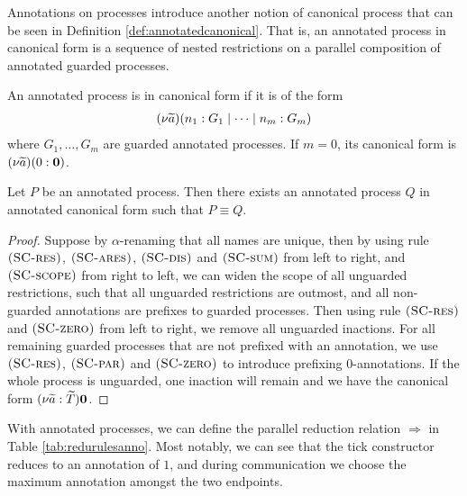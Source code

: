 Annotations on processes introduce another notion of canonical process that can be seen in Definition \ref{def:annotatedcanonical}. That is, an annotated process in canonical form is a sequence of nested restrictions on a parallel composition of annotated guarded processes.

\begin{defi}\label{def:annotatedcanonical}
An annotated process is in canonical form if it is of the form
\begin{align*}
    (\nu \widetilde{a}) (n_1 : G_1 \mid \cdots \mid n_m : G_m)
\end{align*}
where $G_1, \dots, G_m$ are guarded annotated processes. If $m=0$, its canonical form is $(\nu \widetilde{a}) (0 : \mathbf{0})$.
\end{defi}

\begin{lemma}\label{lemma:anncannform}
Let $P$ be an annotated process. Then there exists an annotated process $Q$ in annotated canonical form such that $P \equiv Q$.
\begin{proof}
Suppose by $\alpha$-renaming that all names are unique, then by using rule $\mbox{\textsc{\protect{(SC-res})}}$, $\mbox{\textsc{\protect{(SC-ares})}}$, $\mbox{\textsc{\protect{(SC-dis})}}$ and $\mbox{\textsc{\protect{(SC-sum})}}$ from left to right, and $\mbox{\textsc{\protect{(SC-scope})}}$ from right to left, we can widen the scope of all unguarded restrictions, such that all unguarded restrictions are outmost, and all non-guarded annotations are prefixes to guarded processes. Then using rule $\mbox{\textsc{\protect{(SC-res})}}$ and $\mbox{\textsc{\protect{(SC-zero})}}$ from left to right, we remove all unguarded inactions. For all remaining guarded processes that are not prefixed with an annotation, we use $\mbox{\textsc{\protect{(SC-res})}}$, $\mbox{\textsc{\protect{(SC-par})}}$ and $\mbox{\textsc{\protect{(SC-zero})}}$ to introduce prefixing $0$-annotations. If the whole process is unguarded, one inaction will remain and we have the canonical form $(\nu \widetilde{a} : \widetilde{T}) \mathbf{0}$.
\end{proof}
\end{lemma}

With annotated processes, we can define the parallel reduction relation $\Longrightarrow$ in Table \ref{tab:redurulesanno}. Most notably, we can see that the tick constructor reduces to an annotation of $1$, and during communication we choose the maximum annotation amongst the two endpoints.\\

